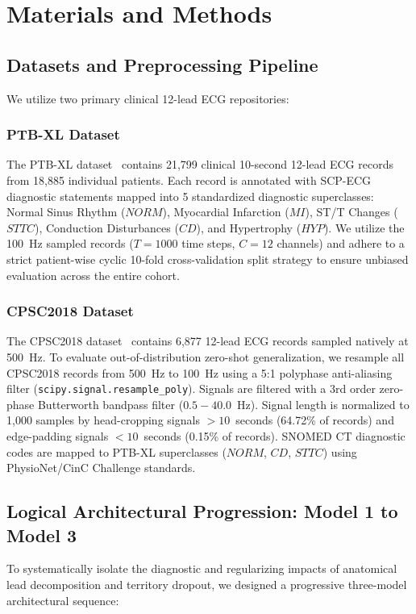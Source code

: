 \documentclass[5p,twocolumn,10pt]{elsarticle}
\begin{document}
\section{Materials and Methods}
\label{sec:methods}

\subsection{Datasets and Preprocessing Pipeline}
We utilize two primary clinical 12-lead ECG repositories:

\subsubsection{PTB-XL Dataset}
The PTB-XL dataset~\cite{wagner2020ptb} contains 21,799 clinical 10-second 12-lead ECG records from 18,885 individual patients. Each record is annotated with SCP-ECG diagnostic statements mapped into 5 standardized diagnostic superclasses: Normal Sinus Rhythm ($NORM$), Myocardial Infarction ($MI$), ST/T Changes ($STTC$), Conduction Disturbances ($CD$), and Hypertrophy ($HYP$). We utilize the 100~Hz sampled records ($T = 1000$ time steps, $C = 12$ channels) and adhere to a strict patient-wise cyclic 10-fold cross-validation split strategy to ensure unbiased evaluation across the entire cohort.

\subsubsection{CPSC2018 Dataset}
The CPSC2018 dataset~\cite{liu2018open} contains 6,877 12-lead ECG records sampled natively at 500~Hz. To evaluate out-of-distribution zero-shot generalization, we resample all CPSC2018 records from 500~Hz to 100~Hz using a 5:1 polyphase anti-aliasing filter (\texttt{scipy.signal.resample\_poly}). Signals are filtered with a 3rd order zero-phase Butterworth bandpass filter ($0.5 - 40.0$~Hz). Signal length is normalized to 1,000 samples by head-cropping signals $> 10$~seconds (64.72\% of records) and edge-padding signals $< 10$~seconds (0.15\% of records). SNOMED CT diagnostic codes are mapped to PTB-XL superclasses ($NORM$, $CD$, $STTC$) using PhysioNet/CinC Challenge standards.

\subsection{Logical Architectural Progression: Model 1 to Model 3}
To systematically isolate the diagnostic and regularizing impacts of anatomical lead decomposition and territory dropout, we designed a progressive three-model architectural sequence:
\end{document}
